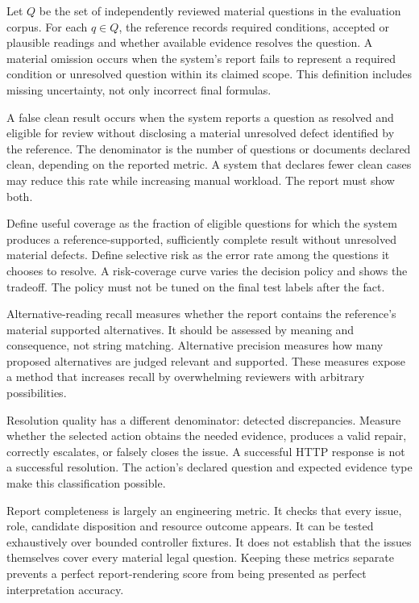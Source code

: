 Let $Q$ be the set of independently reviewed material questions in the evaluation
corpus. For each $q\in Q$, the reference records required conditions, accepted or
plausible readings and whether available evidence resolves the question. A
material omission occurs when the system's report fails to represent a required
condition or unresolved question within its claimed scope. This definition
includes missing uncertainty, not only incorrect final formulas.

A false clean result occurs when the system reports a question as resolved and
eligible for review without disclosing a material unresolved defect identified by
the reference. The denominator is the number of questions or documents declared
clean, depending on the reported metric. A system that declares fewer clean cases
may reduce this rate while increasing manual workload. The report must show both.

Define useful coverage as the fraction of eligible questions for which the system
produces a reference-supported, sufficiently complete result without unresolved
material defects. Define selective risk as the error rate among the questions it
chooses to resolve. A risk-coverage curve varies the decision policy and shows the
tradeoff. The policy must not be tuned on the final test labels after the fact.


Alternative-reading recall measures whether the report contains the reference's
material supported alternatives. It should be assessed by meaning and consequence,
not string matching. Alternative precision measures how many proposed alternatives
are judged relevant and supported. These measures expose a method that increases
recall by overwhelming reviewers with arbitrary possibilities.

Resolution quality has a different denominator: detected discrepancies. Measure
whether the selected action obtains the needed evidence, produces a valid repair,
correctly escalates, or falsely closes the issue. A successful HTTP response is
not a successful resolution. The action's declared question and expected evidence
type make this classification possible.

Report completeness is largely an engineering metric. It checks that every issue,
role, candidate disposition and resource outcome appears. It can be tested
exhaustively over bounded controller fixtures. It does not establish that the
issues themselves cover every material legal question. Keeping these metrics
separate prevents a perfect report-rendering score from being presented as
perfect interpretation accuracy.

